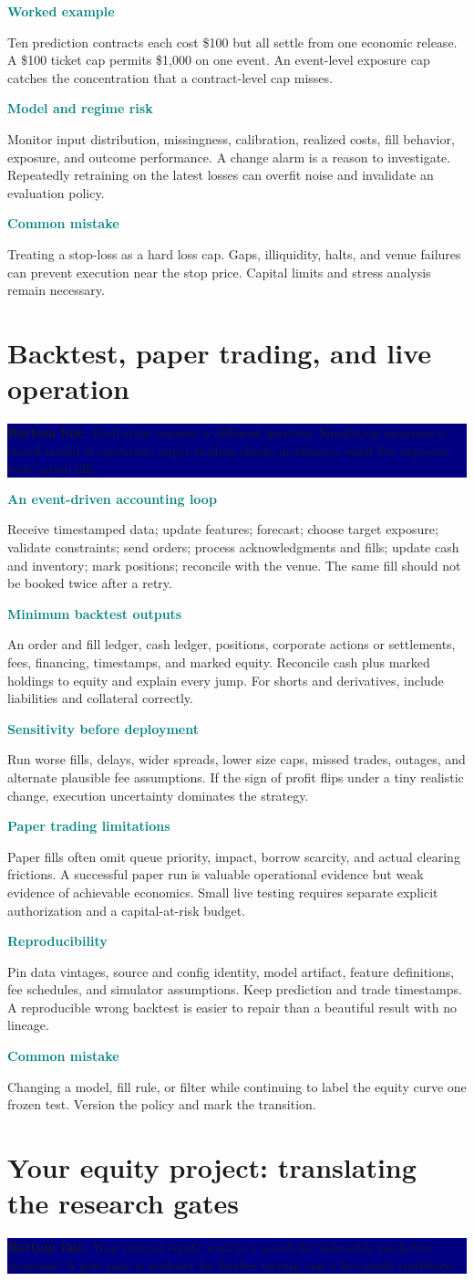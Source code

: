 \documentclass[10pt,letterpaper]{article}
\newcommand{\bl}[1]{\noindent\colorbox{navy}{\parbox{\dimexpr\linewidth-2\fboxsep}{\color{white}\textbf{Bottom line.} #1}}\par\medskip}
\newcommand{\topic}[2]{\clearpage\section{#1}\bl{#2}}
\newcommand{\sub}[1]{\par\textbf{\textcolor{teal}{#1}}\par}
\newcommand{\ex}[1]{\sub{Worked example}#1}
\newcommand{\pit}[1]{\sub{Common mistake}#1}
\begin{document}
\ex{Ten prediction contracts each cost \$100 but all settle from one economic release. A \$100 ticket cap permits \$1,000 on one event. An event-level exposure cap catches the concentration that a contract-level cap misses.}
\sub{Model and regime risk}
Monitor input distribution, missingness, calibration, realized costs, fill behavior, exposure, and outcome performance. A change alarm is a reason to investigate. Repeatedly retraining on the latest losses can overfit noise and invalidate an evaluation policy.
\pit{Treating a stop-loss as a hard loss cap. Gaps, illiquidity, halts, and venue failures can prevent execution near the stop price. Capital limits and stress analysis remain necessary.}
\topic{Backtest, paper trading, and live operation}{Each stage answers a different question. Simulation measures a stated model of execution; paper trading checks machinery; small live exposure tests actual fills.}
\sub{An event-driven accounting loop}
Receive timestamped data; update features; forecast; choose target exposure; validate constraints; send orders; process acknowledgments and fills; update cash and inventory; mark positions; reconcile with the venue. The same fill should not be booked twice after a retry.
\sub{Minimum backtest outputs}
An order and fill ledger, cash ledger, positions, corporate actions or settlements, fees, financing, timestamps, and marked equity. Reconcile cash plus marked holdings to equity and explain every jump. For shorts and derivatives, include liabilities and collateral correctly.
\sub{Sensitivity before deployment}
Run worse fills, delays, wider spreads, lower size caps, missed trades, outages, and alternate plausible fee assumptions. If the sign of profit flips under a tiny realistic change, execution uncertainty dominates the strategy.
\sub{Paper trading limitations}
Paper fills often omit queue priority, impact, borrow scarcity, and actual clearing frictions. A successful paper run is valuable operational evidence but weak evidence of achievable economics. Small live testing requires separate explicit authorization and a capital-at-risk budget.
\sub{Reproducibility}
Pin data vintages, source and config identity, model artifact, feature definitions, fee schedules, and simulator assumptions. Keep prediction and trade timestamps. A reproducible wrong backtest is easier to repair than a beautiful result with no lineage.
\pit{Changing a model, fill rule, or filter while continuing to label the equity curve one frozen test. Version the policy and mark the transition.}
\topic{Your equity project: translating the research gates}{Your current equity work is a search for defensible predictive structure. A gate pass is evidence for further testing, not a live-profit certificate.}
\end{document}
